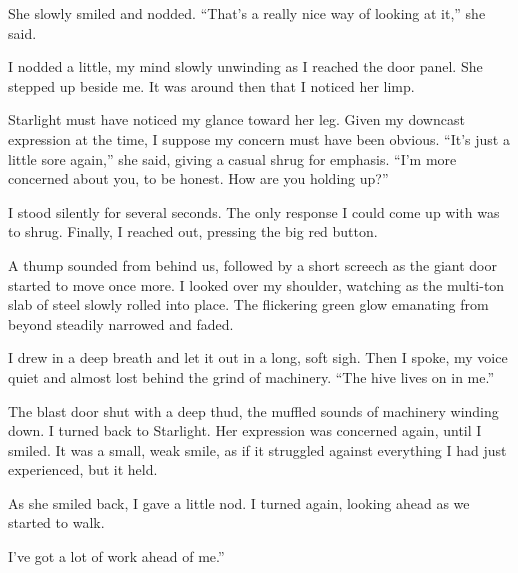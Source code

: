 She slowly smiled and nodded. “That’s a really nice way of looking at it,” she said.

I nodded a little, my mind slowly unwinding as I reached the door panel. She stepped up beside me. It was around then that I noticed her limp.

Starlight must have noticed my glance toward her leg. Given my downcast expression at the time, I suppose my concern must have been obvious. “It’s just a little sore again,” she said, giving a casual shrug for emphasis. “I’m more concerned about you, to be honest. How are you holding up?”

I stood silently for several seconds. The only response I could come up with was to shrug. Finally, I reached out, pressing the big red button.

A thump sounded from behind us, followed by a short screech as the giant door started to move once more. I looked over my shoulder, watching as the multi-ton slab of steel slowly rolled into place. The flickering green glow emanating from beyond steadily narrowed and faded.

I drew in a deep breath and let it out in a long, soft sigh. Then I spoke, my voice quiet and almost lost behind the grind of machinery. “The hive lives on in me.”

The blast door shut with a deep thud, the muffled sounds of machinery winding down. I turned back to Starlight. Her expression was concerned again, until I smiled. It was a small, weak smile, as if it struggled against everything I had just experienced, but it held.

As she smiled back, I gave a little nod. I turned again, looking ahead as we started to walk.

\leavevmode{}I’ve got a lot of work ahead of me.”
